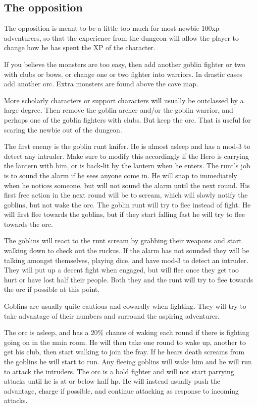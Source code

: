 \subsection*{The opposition}

The opposition is meant to be a little too much for most newbie 100xp adventurers, so that the experience from the dungeon will allow the player to change how he has spent the XP of the character.

If you believe the monsters are too easy, then add another goblin fighter or two with clubs or bows, or change one or two fighter into warriors. In drastic cases add another orc. Extra monsters are found above the cave map.

More scholarly characters or support characters will usually be outclassed by a large degree. Then remove the goblin archer and/or the goblin warrior, and perhaps one of the goblin fighters with clubs. But keep the orc. That is useful for scaring the newbie out of the dungeon.

The first enemy is the goblin runt knifer. He is almost asleep and has a mod-3 to detect any intruder. Make sure to modify this accordingly if the Hero is carrying the lantern with him, or is back-lit by the lantern when he enters. The runt's job is to sound the alarm if he sees anyone come in. He will snap to immediately when he notices someone, but will not sound the alarm until the next round. His first free action in the next round will be to scream, which will slowly notify the goblins, but not wake the orc.
The goblin runt will try to flee instead of fight. He will first flee towards the goblins, but if they start falling fast he will try to flee towards the orc.


The goblins will react to the runt scream by grabbing their weapons and start walking down to check out the ruckus. If the alarm has not sounded they will be talking amongst themselves, playing dice, and have mod-3 to detect an intruder. They will put up a decent fight when engaged, but will flee once they get too hurt or have lost half their people. Both they and the runt will try to flee towards the orc if possible at this point.

Goblins are usually quite cautious and cowardly when fighting. They will try to take advantage of their numbers and surround the aspiring adventurer.


The orc is asleep, and has a 20\% chance of waking each round if there is fighting going on in the main room. He will then take one round to wake up, another to get his club, then start walking to join the fray. If he hears death screams from the goblins he will start to run. Any fleeing goblins will wake him and he will run to attack the intruders. The orc is a bold fighter and will not start parrying attacks until he is at or below half hp. He will instead usually push the advantage, charge if possible, and continue attacking as response to incoming attacks.

